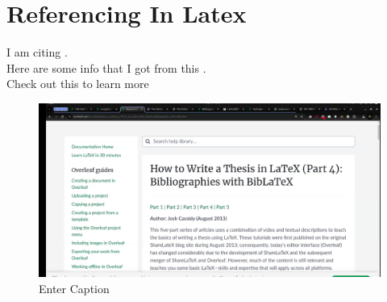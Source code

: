 \documentclass{article}
\begin{document}




\section{Referencing In Latex}

    
    
    

    

I am citing \cite{einstein}.  \\
Here are some info that I got from this \cite{astral_pro_2}. \\
Check out this \cite{latexcompanion} to learn more

\printbibliography  %

\begin{figure}[p]
    \centering
    \includegraphics[width=0.9\linewidth]{image.png}
    \caption{Enter Caption}
    \label{fig:enter-label}
\end{figure}
\end{document}
